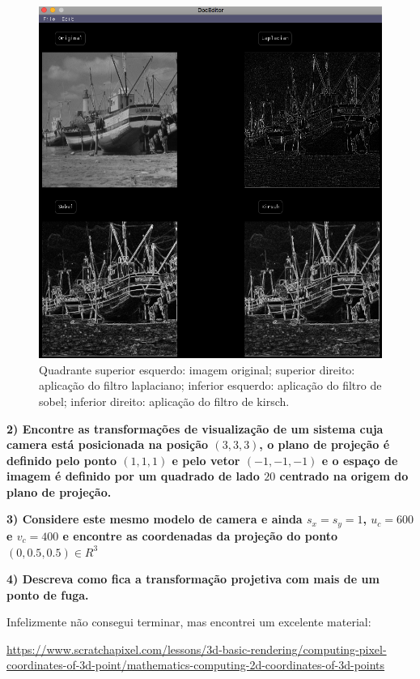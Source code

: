 \documentclass[a4paper]{sbgames}               %
\begin{document}
\begin{figure} [h!]
  \centering 
  \includegraphics[width=0.95\linewidth]{imgs/highpass}
 \caption{Quadrante superior esquerdo: imagem original; superior direito: aplicação do filtro laplaciano; inferior esquerdo: aplicação do filtro de sobel; inferior direito: aplicação do filtro de kirsch.} 
 \label{fig:burstgoogle} 
\end{figure}

\pagebreak

\textbf{2) Encontre as transformações de visualização de um sistema cuja camera está posicionada na posição $(3,3,3)$, o plano de projeção é definido pelo ponto $(1,1,1)$ e pelo vetor $(-1,-1,-1)$ e o espaço de imagem é definido por um quadrado de lado $20$ centrado na origem do plano de projeção.}

\textbf{3) Considere este mesmo modelo de camera e ainda $s_x = s_y = 1$, $u_c = 600$ e $v_c = 400$ e encontre as coordenadas da projeção do ponto $(0,0.5,0.5) \in R^3$}

\textbf{4) Descreva como fica a transformação projetiva com mais de um ponto de fuga.}

Infelizmente não consegui terminar, mas encontrei um excelente material:

{\tiny{\url{https://www.scratchapixel.com/lessons/3d-basic-rendering/computing-pixel-coordinates-of-3d-point/mathematics-computing-2d-coordinates-of-3d-points}}}



\end{document}
